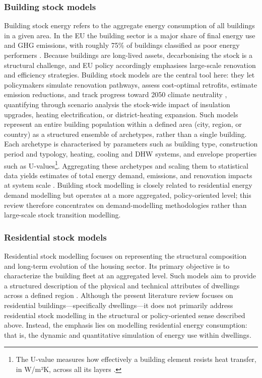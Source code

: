 \subsubsection*{Building stock models}
Building stock energy refers to the aggregate energy consumption of all buildings in a given area. In the EU the building sector is a major share of final energy use and GHG emissions, with roughly 75\% of buildings classified as poor energy performers \cite{nageliBestPracticeReporting2022}. Because buildings are long-lived assets, decarbonising the stock is a structural challenge, and EU policy accordingly emphasises large-scale renovation and efficiency strategies. Building stock models are the central tool here: they let policymakers simulate renovation pathways, assess cost-optimal retrofits, estimate emission reductions, and track progress toward 2050 climate neutrality \cite{EUBuildingStock}, quantifying through scenario analysis the stock-wide impact of insulation upgrades, heating electrification, or district-heating expansion.
\newline Such models represent an entire building population within a defined area (city, region, or country) as a structured ensemble of archetypes, rather than a single building. Each archetype is characterised by parameters such as building type, construction period and typology, heating, cooling and DHW systems, and envelope properties such as U-values\footnote{The U-value measures how effectively a building element resists heat transfer, in W/m²K, across all its layers \cite{yuUValuesBuildingEnvelopes2024}.}. Aggregating these archetypes and scaling them to statistical data yields estimates of total energy demand, emissions, and renovation impacts at system scale \cite{hongTenQuestionsBuilding2025}. Building stock modelling is closely related to residential energy demand modelling but operates at a more aggregated, policy-oriented level; this review therefore concentrates on demand-modelling methodologies rather than large-scale stock transition modelling.


\subsubsection*{Residential stock models}
Residential stock modelling focuses on representing the structural composition and long-term evolution of the housing sector. Its primary objective is to characterize the building fleet at an aggregated level. Such models aim to provide a structured description of the physical and technical attributes of dwellings across a defined region \cite{hongTenQuestionsBuilding2025}.
\newline Although the present literature review focuses on residential buildings—specifically dwellings—it does not primarily address residential stock modelling in the structural or policy-oriented sense described above. Instead, the emphasis lies on modelling residential energy consumption: that is, the dynamic and quantitative simulation of energy use within dwellings.


